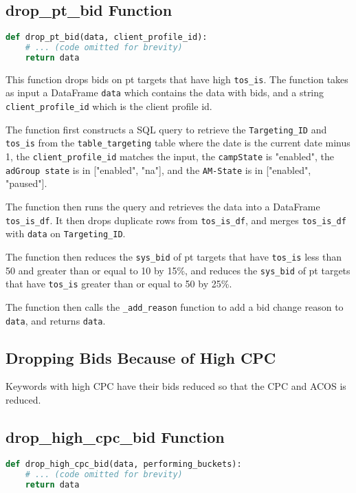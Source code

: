\subsection*{drop\_pt\_bid Function}

\begin{lstlisting}[language=Python]
def drop_pt_bid(data, client_profile_id):
    # ... (code omitted for brevity)
    return data
\end{lstlisting}

This function drops bids on pt targets that have high \verb|tos_is|. The function takes as input a DataFrame \verb|data| which contains the data with bids, and a string \verb|client_profile_id| which is the client profile id.

The function first constructs a SQL query to retrieve the \verb|Targeting_ID| and \verb|tos_is| from the \verb|table_targeting| table where the date is the current date minus 1, the \verb|client_profile_id| matches the input, the \verb|campState| is "enabled", the \verb|adGroup state| is in ["enabled", "na"], and the \verb|AM-State| is in ["enabled", "paused"].

The function then runs the query and retrieves the data into a DataFrame \verb|tos_is_df|. It then drops duplicate rows from \verb|tos_is_df|, and merges \verb|tos_is_df| with \verb|data| on \verb|Targeting_ID|.

The function then reduces the \verb|sys_bid| of pt targets that have \verb|tos_is| less than 50 and greater than or equal to 10 by 15\%, and reduces the \verb|sys_bid| of pt targets that have \verb|tos_is| greater than or equal to 50 by 25\%.

The function then calls the \verb|_add_reason| function to add a bid change reason to \verb|data|, and returns \verb|data|.

\subsection{Dropping Bids Because of High CPC}

Keywords with high CPC have their bids reduced so that the CPC and ACOS is reduced.

\subsection*{drop\_high\_cpc\_bid Function}

\begin{lstlisting}[language=Python]
def drop_high_cpc_bid(data, performing_buckets):
    # ... (code omitted for brevity)
    return data
\end{lstlisting}

